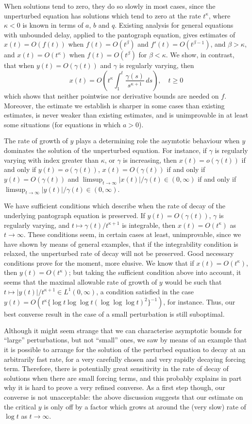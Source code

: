 \documentclass[a4paper,10pt,reqno]{amsart}
\numberwithin{equation}{section}
\theoremstyle{definition}
\theoremstyle{remark}
\DeclareMathOperator{\1}{\mathbbm 1}
\begin{document}
When solutions tend to zero, they do so slowly in most cases, since the unperturbed equation has solutions which tend to zero at the rate $t^\kappa$, where $\kappa<0$ is known in terms of $a$, $b$ and $q$. Existing analysis for general equations with unbounded delay, applied to the pantograph equation, gives estimates of $x(t)=O(f(t))$ when $f(t)=O(t^\beta)$ and $f'(t)=O(t^{\beta-1})$, and $\beta>\kappa$, and $x(t)=O(t^\kappa)$ when $f(t)=O(t^\beta)$ for $\beta<\kappa$. We show, in contrast, that when $y(t)=O(\gamma(t))$ and $\gamma$ is regularly varying, then 
\[
x(t)=O\left(t^\kappa \int_1^t \frac{\gamma(s)}{s^{\kappa+1}}\,ds\right),\quad t\geq 0
\]     
which shows that neither pointwise nor derivative bounds are needed on $f$. Moreover, the estimate we establish is sharper in some cases than existing estimates, is never weaker than existing estimates, and is unimprovable in at least some situations (for equations in which $a>0$). 

The rate of growth of $y$ plays a determining role the asymtotic behaviour when $y$ dominates the solution of the unperturbed equation. For instance, if $\gamma$ is regularly varying with index greater than $\kappa$, or $\gamma$ is increasing, then $x(t)=o(\gamma(t))$ if and only if $y(t)=o(\gamma(t))$, $x(t)=O(\gamma(t))$ if and only if $y(t)=O(\gamma(t))$ and $\limsup_{t\to\infty} |x(t)|/\gamma(t)\in (0,\infty)$ if and only if $\limsup_{t\to\infty}|y(t)|/\gamma(t)\in (0,\infty)$. 

We have sufficient conditions which describe when the rate of decay of the underlying pantograph equation is preserved. If $y(t)=O(\gamma(t))$, $\gamma$ is regularly varying, and $t\mapsto\gamma(t)/t^{\kappa+1}$ is integrable, then $x(t)=O(t^\kappa)$ as $t\to\infty$. These conditions seem, in certain cases at least, unimprovable, since we have shown by means of general examples, that if the integrability condition is relaxed, the unperturbed rate of decay will not be preserved. Good necessary conditions prove for the moment, more elusive. We know that if $x(t)=O(t^\kappa)$, then $y(t)=O(t^\kappa)$; but taking the sufficient condition above into account, it seems that the maximal allowable rate of growth of $y$ would be such that $t\mapsto |y(t)|/t^{\kappa+1}\in L^1(0,\infty)$, a condition satisfied in the case $y(t)=O(t^\kappa\{\log t\log\log t(\log\log \log t)^2\}^{-1})$, for instance. Thus, our best converse result in the case of a small perturbation is still suboptimal. 

Although it might seem strange that we can characterise asymptotic bounds for ``large'' perturbations, but not ``small'' ones, we saw by means of an example that it is possible to arrange for the solution of the perturbed equation to decay at an arbitrarily fast rate, for a very carefully chosen and very rapidly decaying forcing term. Therefore, there is potentially great sensitivity in the rate of decay of solutions when there are small forcing terms, and this probably explains in part why it is hard to prove a very refined converse. As a first step though, our converse is not unacceptable: the above discussion suggests that our estimate on the critical $y$ is only off by a factor which grows at around the (very slow) rate of $\log t$ as $t\to\infty$.   
\end{document}
